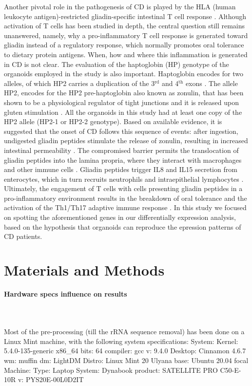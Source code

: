 \documentclass[12pt]{article}
\begin{document}
Another pivotal role in the pathogenesis of CD is played by the
HLA (human leukocyte antigen)-restricted gliadin-specific intestinal T cell response \supercite{sollid2013triggers,iversen2020evidence}.
Although activation of T cells has been studied in depth, the central question still remains
unanswered, namely, why a pro-inflammatory T cell response is generated toward gliadin
instead of a regulatory response, which normally promotes oral tolerance to dietary protein
antigens. When, how and where this inflammation is generated in CD is not clear.
The evaluation of the haptoglobin (HP) genotype of the organoids employed in the study is also important. Haptoglobin encodes for two alleles, of which HP2 carries a duplication of the 3$^{\text{rd}}$ and 4$^{\text{th}}$ exons \supercite{maeda1984duplication}. The allele HP2, encodes for the HP2 pre-haptoglobin also known as zonulin, that has been shown to be a physiological regulator of tight junctions and it is released upon gluten stimulation \supercite{lammers2008gliadin}. All the organoids in this study had at least one copy of the HP2 allele (HP2-1 or HP2-2 genotype). Based on available evidence, it is suggested that the onset of CD follows this sequence of events: after ingestion, undigested gliadin peptides stimulate the release of zonulin, resulting in increased intestinal permeability \supercite{drago2006gliadin,hollon2015effect}. The compromised barrier permits the translocation of gliadin peptides into the lamina propria, where they interact with macrophages and other immune cells \supercite{fasano2011zonulin}. Gliadin peptides trigger IL8 and IL15 secretion from enterocytes, which in turn recruits neutrophils \supercite{lammers2011identification} and intraepithelial lymphocytes \supercite{di2006epithelium}. Ultimately, the engagement of T cells with cells presenting gliadin peptides in a pro-inflammatory environment results in the breakdown of oral tolerance and the activation of the Th1/Th17 adaptive immune response \supercite{serena2015role}. In this study we focused on spotting the aforementioned genes in our differentially expression analysis, based on the hypothesis that organoids can reproduce the epression patterns of CD patients.

 
\section{Materials and Methods}
\paragraph{Hardware specs influence on results}\hspace{0pt}\\\\
\noindent Most of the pre-processing (till the rRNA sequence removal) has been done on a Linux Mint machine, with the following system specifications:
System:    Kernel: 5.4.0-135-generic x86\_64 bits: 64 compiler: gcc v: 9.4.0 
           Desktop: Cinnamon 4.6.7 wm: muffin dm: LightDM Distro: Linux Mint 20 Ulyana 
           base: Ubuntu 20.04 focal 
Machine:   Type: Laptop System: Dynabook product: SATELLITE PRO C50-E-10R v: PYS20E-00L0D2IT 
           
\end{document}
